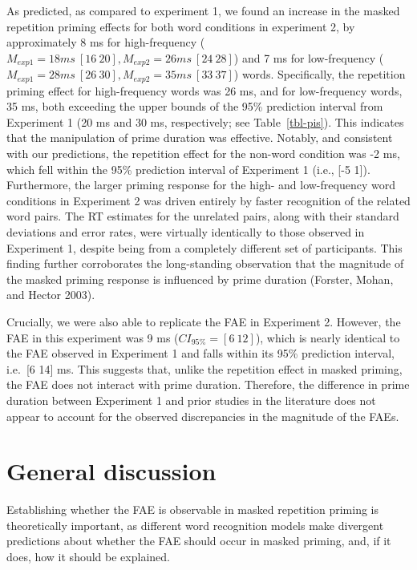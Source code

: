\documentclass[
]{interact}
\begin{document}
As predicted, as compared to experiment 1, we found an increase in the
masked repetition priming effects for both word conditions in experiment
2, by approximately 8 ms for high-frequency
(\(M_{exp1} = 18ms ~ [16 ~ 20], M_{exp2} = 26ms ~ [24 ~ 28]\)) and 7 ms
for low-frequency
(\(M_{exp1} = 28ms ~ [26 ~ 30], M_{exp2} = 35ms ~ [33 ~ 37]\)) words.
Specifically, the repetition priming effect for high-frequency words was
26 ms, and for low-frequency words, 35 ms, both exceeding the upper
bounds of the 95\% prediction interval from Experiment 1 (20 ms and 30
ms, respectively; see Table~\ref{tbl-pis}). This indicates that the
manipulation of prime duration was effective. Notably, and consistent
with our predictions, the repetition effect for the non-word condition
was -2 ms, which fell within the 95\% prediction interval of Experiment
1 (i.e., {[}-5 1{]}). Furthermore, the larger priming response for the
high- and low-frequency word conditions in Experiment 2 was driven
entirely by faster recognition of the related word pairs. The RT
estimates for the unrelated pairs, along with their standard deviations
and error rates, were virtually identically to those observed in
Experiment 1, despite being from a completely different set of
participants. This finding further corroborates the long-standing
observation that the magnitude of the masked priming response is
influenced by prime duration (Forster, Mohan, and Hector 2003).

Crucially, we were also able to replicate the FAE in Experiment 2.
However, the FAE in this experiment was 9 ms (\(CI_{95\%} = [6 ~ 12]\)),
which is nearly identical to the FAE observed in Experiment 1 and falls
within its 95\% prediction interval, i.e.~{[}6 14{]} ms. This suggests
that, unlike the repetition effect in masked priming, the FAE does not
interact with prime duration. Therefore, the difference in prime
duration between Experiment 1 and prior studies in the literature does
not appear to account for the observed discrepancies in the magnitude of
the FAEs.

\section{General discussion}\label{sec-discussion}

Establishing whether the FAE is observable in masked repetition priming
is theoretically important, as different word recognition models make
divergent predictions about whether the FAE should occur in masked
priming, and, if it does, how it should be explained.
\end{document}
